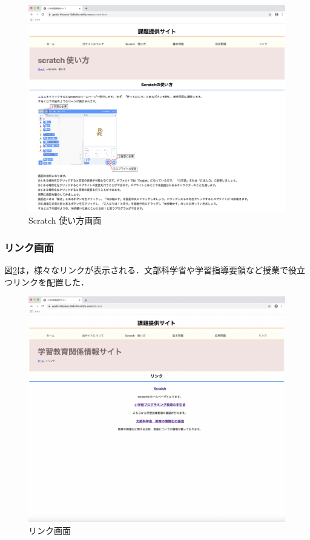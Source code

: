 \begin{figure}[h]
\begin{center}
\includegraphics[width=15cm]{Scratch.pdf}
\caption{Scratch 使い方画面}
\label{fig:tukaigamen}
\end{center}
\end{figure}

\newpage

\subsubsection{リンク画面}
図\ref{fig:linkgamen}は，様々なリンクが表示される．文部科学省や学習指導要領など授業で役立つリンクを配置した．

\begin{figure}[h]
\begin{center}
\includegraphics[width=15cm]{Link.pdf}
\caption{リンク画面}
\label{fig:linkgamen}
\end{center}
\end{figure}

